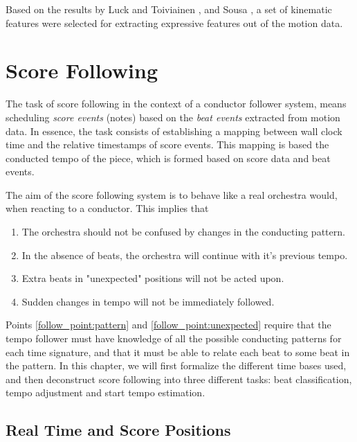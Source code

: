 Based on the results by Luck and Toiviainen \cite{luck2010},
and Sousa \cite{sousa1988},
a set of kinematic features were selected for extracting
expressive features out of the motion data.

\chapter{Score Following}
\label{chapter:score_following}

The task of score following in the context
of a conductor follower system,
means scheduling \textit{score events} (notes)
based on the \textit{beat events} extracted
from motion data.
In essence, the task consists of establishing a mapping between
wall clock time and the relative timestamps of score events.
This mapping is based the conducted tempo of the piece,
which is formed based on score data and beat events.

The aim of the score following system
is to behave like a real orchestra would,
when reacting to a conductor.
This implies that
\begin{enumerate}
\item The orchestra should not be confused by changes in the conducting pattern. \label{follow_point:pattern}
\item In the absence of beats, the orchestra will continue with it's previous tempo.
\item Extra beats in "unexpected" positions will not be acted upon. \label{follow_point:unexpected}
\item Sudden changes in tempo will not be immediately followed.
\end{enumerate}
Points \ref{follow_point:pattern} and \ref{follow_point:unexpected} require
that the tempo follower must have knowledge of all the possible
conducting patterns for each time signature,
and that it must be able to relate each beat to some beat in the pattern.
In this chapter,
we will first formalize the different time bases used,
and then deconstruct score following into
three different tasks:
beat classification, tempo adjustment and start tempo estimation.

\section{Real Time and Score Positions}
\label{sec:meth:read_and_score_time}

